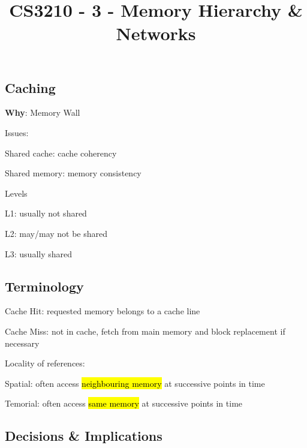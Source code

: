 \documentclass[12pt]{article}
\title{\textbf{CS3210 - 3 - Memory Hierarchy \& Networks}}
\date{}
\begin{document}
\maketitle

\begin{spacing}{1.5}

\section{Caching}

\begin{itemize*}
	\item \textbf{Why}: Memory Wall
	\item Issues: 
		\begin{itemize*}
			\item Shared cache: cache coherency
			\item Shared memory: memory consistency
		\end{itemize*}
	\item Levels
		\begin{itemize*}
			\item L1: usually not shared
			\item L2: may/may not be shared
			\item L3: usually shared
		\end{itemize*}
\end{itemize*}

\subsection{Terminology}

\begin{itemize*}
	\item Cache Hit: requested memory belongs to a cache line
	\item Cache Miss: not in cache, fetch from main memory and block replacement if necessary
	\item Locality of references:
		\begin{itemize*}
			\item Spatial: often access \hl{neighbouring memory} at successive points in time
			\item Temorial: often access \hl{same memory} at successive points in time 
		\end{itemize*}
\end{itemize*}

\subsection{Decisions \& Implications}


\end{spacing}
\end{document}
